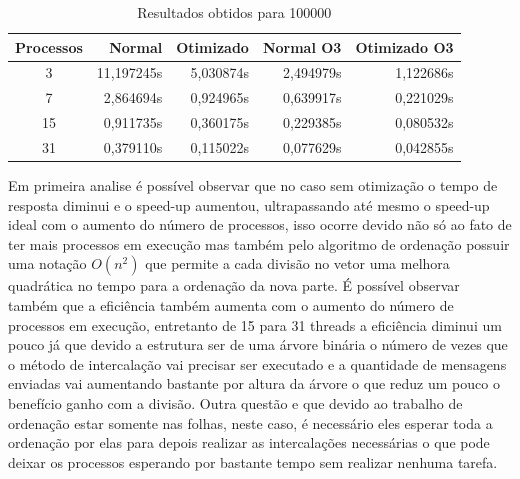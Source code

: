 \documentclass[9pt]{IEEEtran}
\begin{document}
	\begin{table}[H]
		\centering
			\begin{tabular}{c|r|r|r|r}
				Processos & Normal & Otimizado & Normal O3 & Otimizado O3 \\
				\hline
				3  & 11,197245s & 5,030874s & 2,494979s & 1,122686s \\
				\hline
				7  &  2,864694s & 0,924965s & 0,639917s & 0,221029s \\
				\hline
				15 &  0,911735s & 0,360175s & 0,229385s & 0,080532s \\
				\hline
				31 &  0,379110s & 0,115022s & 0,077629s & 0,042855s \\
			\end{tabular}
		\caption{Resultados obtidos para 100000}
		\label{result_table}
	\end{table}

	Em primeira analise é possível observar que no caso sem otimização o tempo
	de resposta diminui e o speed-up aumentou, ultrapassando até mesmo o
	speed-up ideal com o aumento do número de processos, isso ocorre devido não
	só ao fato de ter mais processos em execução mas também pelo algoritmo de
	ordenação possuir uma notação $O(n^2)$ que permite a cada divisão no vetor
	uma melhora quadrática no tempo para a ordenação da nova parte. É possível
	observar também que a eficiência também aumenta com o aumento do número de
	processos em execução, entretanto de 15 para 31 threads a eficiência diminui
	um pouco já que devido a estrutura ser de uma árvore binária o número de
	vezes que o método de intercalação vai precisar ser executado e a quantidade
	de mensagens enviadas vai aumentando bastante por altura da árvore o que
	reduz um pouco o benefício ganho com a divisão. Outra questão e que devido
	ao trabalho de ordenação estar somente nas folhas, neste caso, é necessário
	eles esperar toda a ordenação por elas para depois realizar as intercalações
	necessárias o que pode deixar os processos esperando por bastante tempo sem
	realizar nenhuma tarefa.
\end{document}
